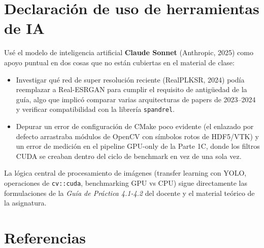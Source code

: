 \documentclass[12pt,a4paper]{article}
\begin{document}
\section*{Declaración de uso de herramientas de IA}

Usé el modelo de inteligencia artificial \textbf{Claude Sonnet} (Anthropic, 2025) como apoyo puntual en dos cosas que no están cubiertas en el material de clase:

\begin{itemize}
  \item Investigar qué red de super resolución reciente (RealPLKSR, 2024) podía reemplazar a Real-ESRGAN para cumplir el requisito de antigüedad de la guía, algo que implicó comparar varias arquitecturas de papers de 2023--2024 y verificar compatibilidad con la librería \texttt{spandrel}.
  \item Depurar un error de configuración de CMake poco evidente (el enlazado por defecto arrastraba módulos de OpenCV con símbolos rotos de HDF5/VTK) y un error de medición en el pipeline GPU-only de la Parte 1C, donde los filtros CUDA se creaban dentro del ciclo de benchmark en vez de una sola vez.
\end{itemize}

La lógica central de procesamiento de imágenes (transfer learning con YOLO, operaciones de \texttt{cv::cuda}, benchmarking GPU vs CPU) sigue directamente las formulaciones de la \textit{Guía de Práctica 4.1-4.2} del docente y el material teórico de la asignatura.

\section*{Referencias}
\end{document}
